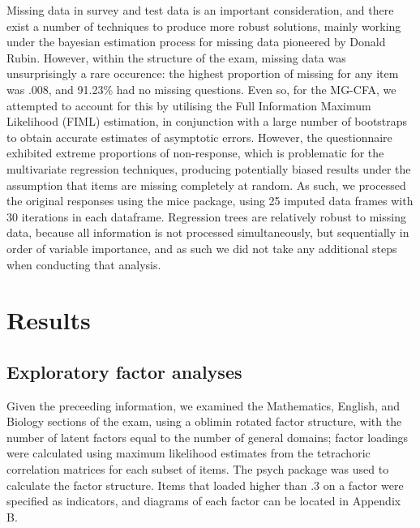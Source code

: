 \documentclass{article}\usepackage[]{graphicx}\usepackage[]{color}
\begin{document}
Missing data in survey and test data is an important consideration, and there exist a number of techniques to produce more robust solutions, mainly working under the bayesian estimation process for missing data pioneered by Donald Rubin\cite{rubin}. However, within the structure of the exam, missing data was unsurprisingly a rare occurence: the highest proportion of missing for any item was .008, and 91.23\% had no missing questions. Even so, for the MG-CFA, we attempted to account for this by utilising the Full Information Maximum Likelihood (FIML) estimation, in conjunction with a large number of bootstraps to obtain accurate estimates of asymptotic errors. However, the questionnaire exhibited extreme proportions of non-response, which is problematic for the multivariate regression techniques, producing potentially biased results under the assumption that items are missing completely at random. As such, we processed the original responses using the mice package\cite{mice}, using 25 imputed data frames with 30 iterations in each dataframe. Regression trees are relatively robust to missing data, because all information is not processed simultaneously, but sequentially in order of variable importance, and as such we did not take any additional steps when conducting that analysis.
\section{Results}
\subsection{Exploratory factor analyses}
Given the preceeding information, we examined the Mathematics, English, and Biology sections of the exam, using a oblimin rotated factor structure, with the number of latent factors equal to the number of general domains; factor loadings were calculated using maximum likelihood estimates from the tetrachoric correlation matrices for each subset of items. The psych package was used to calculate the factor structure. Items that loaded higher than .3 on a factor were specified as indicators, and diagrams of each factor can be located in Appendix B.
\end{document}
